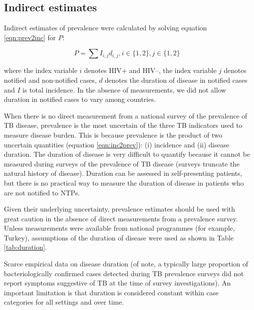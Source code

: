 \subsection{Indirect estimates}
Indirect estimates of prevalence were calculated by solving equation \ref{eqn:prev2inc} for $P$:

\begin{equation}
P = \sum I_{i,j} d_{i,j}, i \in \lbrace 1, 2\rbrace, j \in \lbrace 1, 2\rbrace
\label{eqn:inc2prev}
\end{equation}

where the index variable $i$ denotes HIV+ and HIV–, the index variable $j$ denotes notified and non-notified cases, $d$ denotes the duration of disease in notified cases and $I$ is total incidence. In the absence of measurements, we did not allow duration in notified cases to vary among countries. 

When there is no direct measurement from a national survey of the prevalence of TB disease, prevalence is the most uncertain of the three TB indicators used to measure disease burden. This is because prevalence is the product of two uncertain quantities (equation \ref{eqn:inc2prev}): (i) incidence and (ii) disease duration. The duration of disease is very difficult to quantify because it cannot be measured during surveys of the prevalence of TB disease (surveys truncate the natural history of disease). Duration can be assessed in self-presenting patients, but there is no practical way to measure the duration of disease in patients who are not notified to NTPs.

Given their underlying uncertainty, prevalence estimates should be used with great caution in the absence of direct measurements from a prevalence survey. Unless measurements were available from national programmes (for example, Turkey), assumptions of the duration of disease were used as shown in Table \ref{tab:duration}.

Scarce empirical data on disease duration (of note, a typically large proportion of bacteriologically confirmed cases detected during TB prevalence surveys did not report symptoms suggestive of TB at the time of survey investigations). An important limitation is that duration is considered constant within case categories for all settings and over time.